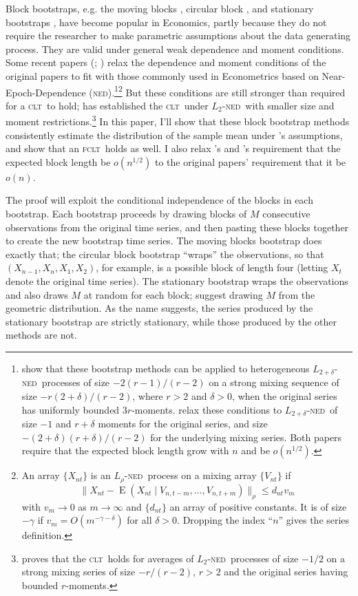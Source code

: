 \documentclass[12pt]{article}
\newcommand\citepos[2][]{\citeauthor{#2}'s \citeyearpar[#1]{#2}}
\theoremstyle{definition}
\DeclareMathOperator{\E}{E}
\newcommand{\clt}{\textsc{clt}}
\newcommand{\fclt}{\textsc{fclt}}
\newcommand{\ned}{\textsc{ned}}
\begin{document}
\newpage\noindent Block bootstraps, e.g. the moving blocks
\citep{Kun:89,LiS:92}, circular block \citep{PoR:92}, and stationary
bootstraps \citep{PoR:94}, have become popular in Economics, partly
because they do not require the researcher to make parametric
assumptions about the data generating process.  They are valid under
general weak dependence and moment conditions.  Some recent papers
(\citealp{GoW:02}; \citealp{GoJ:03}) relax the dependence and moment
conditions of the original papers to fit with those commonly used in
Econometrics based on Near-Epoch-Dependence
(\ned).\footnote{\citet{GoW:02} show that these bootstrap methods can
  be applied to heterogeneous $L_{2+\delta}$-\ned\ processes of size
  $-2(r-1)/(r-2)$ on a strong mixing sequence of size
  $-r(2+\delta)/(r-2)$, where $r > 2$ and $\delta >0$, when the
  original series has uniformly bounded $3r$-moments.  \citet{GoJ:03}
  relax these conditions to $L_{2+\delta}$-\ned\ of size $-1$ and
  $r+\delta$ moments for the original series, and size
  $-(2+\delta)(r+\delta)/(r-2)$ for the underlying mixing series.
  Both papers require that the expected block length grow with $n$ and
  be $o(n^{1/2})$.}\footnote{An array $\{X_{nt}\}$ is an
  $L_{\rho}$-\ned\ process on a mixing array $\{V_{nt}\}$ if
  \begin{equation}
    \| X_{nt} - \E(X_{nt}
    \mid V_{n,t-m},\dots,V_{n,t+m}) \|_{\rho} \leq d_{nt} v_m
  \end{equation} 
  with $v_m \to 0$ as $m \to \infty$ and $\{d_{nt}\}$ an array of
  positive constants.  It is of size $-\gamma$ if $v_m = O(m^{-\gamma
    - \delta})$ for all $\delta>0$.  Dropping the index ``$n$'' gives
  the series definition.} But these conditions are still stronger than
required for a \clt\ to hold; \citet{Jon:97} has established the \clt\
under $L_2$-\ned\ with smaller size and moment
restrictions.\footnote{\citet{Jon:97} proves that the \clt\ holds for
  averages of $L_2$-\ned\ processes of size $-1/2$ on a strong mixing
  series of size $-r/(r-2)$, $r > 2$ and the original series having
  bounded $r$-moments.}  In this paper, I'll show that these block
bootstrap methods consistently estimate the distribution of the sample
mean under \citepos{Jon:97} assumptions, and show that an \fclt\ holds
as well.  I also relax \citepos{GoW:02} and \citepos{GoJ:03}
requirement that the expected block length be $o(n^{1/2})$ to the
original papers' requirement that it be $o(n)$.

The proof will exploit the conditional independence of the blocks in
each bootstrap.  Each bootstrap proceeds by drawing blocks of $M$
consecutive observations from the original time series, and then
pasting these blocks together to create the new bootstrap time series.
The moving blocks bootstrap does exactly that; the circular block
bootstrap ``wraps'' the observations, so that $(X_{n-1}, X_n, X_1,
X_2)$, for example, is a possible block of length four (letting $X_t$
denote the original time series).  The stationary bootstrap wraps the
observations and also draws $M$ at random for each block;
\citet{PoR:94} suggest drawing $M$ from the geometric distribution.
As the name suggests, the series produced by the stationary bootstrap
are strictly stationary, while those produced by the other methods are
not.
\end{document}
